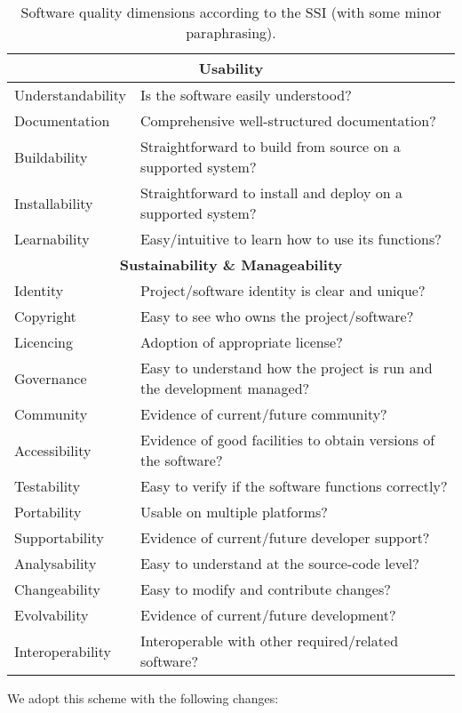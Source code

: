 \documentclass[a4paper,11pt]{article}
\begin{document}
\begin{table}[hbt]
\begin{tabular}{l|l}
\hline
\multicolumn{2}{c}{\textbf{Usability}} \\
\hline
Understandability & Is the software easily understood? \\ 
Documentation & Comprehensive well-structured documentation? \\
Buildability  & Straightforward to build from source on a supported system? \\
Installability  & Straightforward to install and deploy on a supported system? \\
Learnability & Easy/intuitive to learn how to use its functions? \\
\hline
\multicolumn{2}{c}{\textbf{Sustainability \& Manageability}} \\
\hline
Identity & Project/software identity is clear and unique? \\
Copyright & Easy to see who owns the project/software? \\
Licencing & Adoption of appropriate license? \\
Governance & Easy to understand how the project is run and the development managed? \\
Community & Evidence of current/future community? \\
Accessibility & Evidence of good facilities to obtain versions of the software? \\
Testability & Easy to verify if the software functions correctly? \\
Portability & Usable on multiple platforms? \\
Supportability & Evidence of current/future developer support? \\
Analysability & Easy to understand at the source-code level? \\
Changeability & Easy to modify and contribute changes? \\
Evolvability & Evidence of current/future development? \\
Interoperability & Interoperable with other required/related software? \\
\hline
\end{tabular}
\caption{Software quality dimensions according to the SSI \citep{SSIGUIDE} (with some minor paraphrasing).}
\label{tab:criteria}
\end{table}

We adopt this scheme with the following changes:
\end{document}
